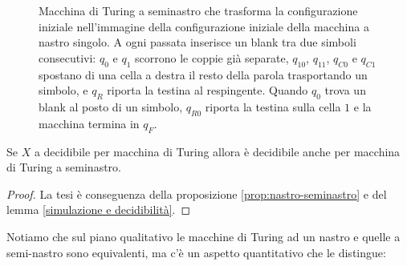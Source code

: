 \begin{figure}[H]
\caption{Macchina di Turing a seminastro che trasforma la configurazione iniziale nell'immagine della configurazione iniziale della macchina a nastro singolo. A ogni passata inserisce un blank tra due simboli consecutivi: $q_0$ e $q_1$ scorrono le coppie già separate, $q_{10}$, $q_{11}$, $q_{C0}$ e $q_{C1}$ spostano di una cella a destra il resto della parola trasportando un simbolo, e $q_R$ riporta la testina al respingente. Quando $q_0$ trova un blank al posto di un simbolo, $q_{R0}$ riporta la testina sulla cella $1$ e la macchina termina in $q_F$.}
\label{fig:turing-seminastro-init}
\end{figure}

\begin{coro}
Se $X$ a decidibile per macchina di Turing
allora è decidibile anche per 
macchina di Turing a seminastro.
\begin{proof}
    La tesi è conseguenza 
    della proposizione
    \ref{prop:nastro-seminastro} 
    e del lemma
    \ref{simulazione e decidibilità}.
\end{proof}
\end{coro}

Notiamo che sul piano qualitativo le macchine di Turing ad un nastro e quelle a semi-nastro sono equivalenti, ma c'è un aspetto quantitativo che le distingue:


